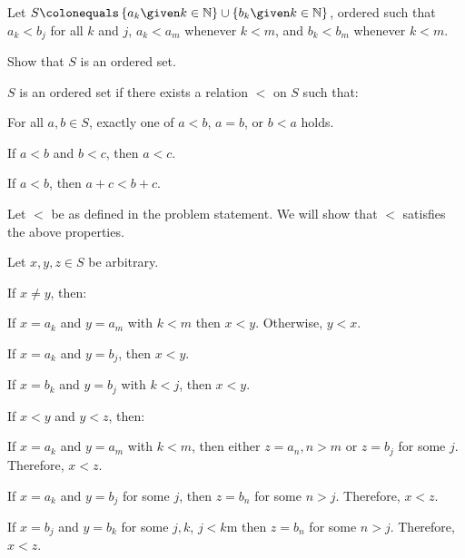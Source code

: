 \begin{problem}
  Let $S \colonequals \set{ a_k \given k \in \N} \cup \set{b_k \given k \in \N}$,
  ordered such that $a_k < b_j$ for all $k$ and $j$,
  $a_k < a_m$ whenever $k < m$, and $b_k < b_m$ whenever $k < m$.
  \begin{enumalph}
    \item Show that $S$ is an ordered set.
      \begin{answer}
        $S$ is an ordered set if there exists a relation $<$ on $S$ such that:
        \begin{enumarabic}
          \item For all $a, b \in S$, exactly one of $a < b$, $a = b$, or $b < a$ holds.
          \item If $a < b$ and $b < c$, then $a < c$.
          \item If $a < b$, then $a + c < b + c$.
        \end{enumarabic}

        \step
        Let $<$ be as defined in the problem statement.
        We will show that $<$ satisfies the above properties.

        \step
        Let $x, y, z \in S$ be arbitrary.
        
        \begin{enumroman}
          \item If $x \neq y$, then:
            \begin{enumarabic}
              \item If $x = a_k$ and $y = a_m$ with $k < m$ then $x < y$. Otherwise, $y < x$.
              \item If $x = a_k$ and $y = b_j$, then $x < y$.
              \item If $x = b_k$ and $y = b_j$ with $k < j$, then $x < y$.
            \end{enumarabic}
          \item If $x < y$ and $y < z$, then:
            \begin{enumarabic}
              \item If $x = a_k$ and $y = a_m$ with $k < m$, then either $z = a_n, n > m$ or $z = b_j$ for some $j$. Therefore, $x < z$.
              \item If $x = a_k$ and $y = b_j$ for some $j$, then $z = b_n$ for some $n > j$. Therefore, $x < z$.
              \item If $x = b_j$ and $y = b_k$ for some $j, k$, $j < k$m then $z = b_n$ for some $n > j$. Therefore, $x < z$.
            \end{enumarabic}
        \end{enumroman}
        

\end{answer}
\end{enumalph}
\end{problem}
